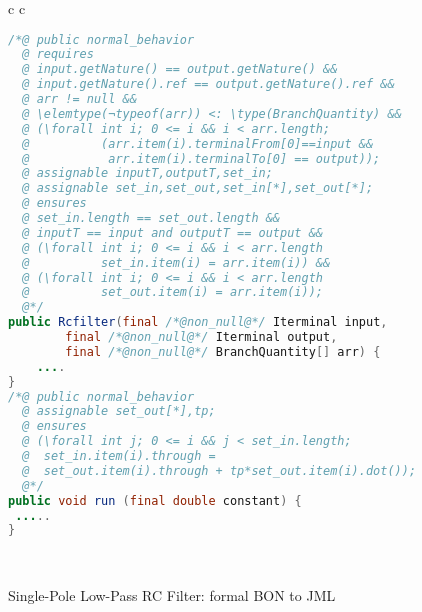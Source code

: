 \begin{figure}[H]
\begin{tabular}{ c  c }
\begin{minipage}[r]{6.6cm}
\begin{lstlisting}[language=Java]
/*@ public normal_behavior
  @ requires
  @ input.getNature() == output.getNature() &&
  @ input.getNature().ref == output.getNature().ref &&
  @ arr != null && 
  @ \elemtype(¬typeof(arr)) <: \type(BranchQuantity) &&
  @ (\forall int i; 0 <= i && i < arr.length;
  @          (arr.item(i).terminalFrom[0]==input &&
  @           arr.item(i).terminalTo[0] == output));
  @ assignable inputT,outputT,set_in;
  @ assignable set_in,set_out,set_in[*],set_out[*];
  @ ensures
  @ set_in.length == set_out.length &&
  @ inputT == input and outputT == output &&
  @ (\forall int i; 0 <= i && i < arr.length 
  @          set_in.item(i) = arr.item(i)) &&
  @ (\forall int i; 0 <= i && i < arr.length 
  @          set_out.item(i) = arr.item(i)); 
  @*/
public Rcfilter(final /*@non_null@*/ Iterminal input, 
		final /*@non_null@*/ Iterminal output, 
		final /*@non_null@*/ BranchQuantity[] arr) {
	....
}
/*@ public normal_behavior
  @ assignable set_out[*],tp;
  @ ensures
  @ (\forall int j; 0 <= i && j < set_in.length;
  @  set_in.item(i).through = 
  @  set_out.item(i).through + tp*set_out.item(i).dot()); 
  @*/
public void run (final double constant) {
 .....	
}
\end{lstlisting}
\end{minipage}\\  
\end{tabular}
\caption{Single-Pole Low-Pass RC Filter: formal BON to JML}
\label{tab:rescapsecond} 
\end{figure}

